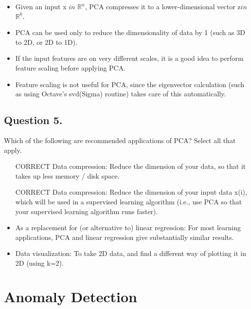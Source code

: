 \begin{itemize}
\item Given an input x $in$ $\mathbb{R}^n$, PCA compresses it to a lower-dimensional vector z$in$ $\mathbb{R}^k$.

\item PCA can be used only to reduce the dimensionality of data by 1 (such as 3D to 2D, or 2D to 1D).

\item If the input features are on very different scales, it is a good idea to perform feature scaling before applying PCA.

\item Feature scaling is not useful for PCA, since the eigenvector calculation (such as using Octave's svd(Sigma) routine) takes care of this automatically.
\end{itemize}
\subsection{ Question 5. }
Which of the following are recommended applications of PCA? Select all that apply.

\begin{itemize}
\item [CORRECT] Data compression: Reduce the dimension of your data, so that it takes up less memory / disk space.

\item [CORRECT] Data compression: Reduce the dimension of your input data x(i), which will be used in a supervised learning algorithm (i.e., use PCA so that your supervised learning algorithm runs faster).

\item As a replacement for (or alternative to) linear regression: For most learning applications, PCA and linear regression give substantially similar results.

\item Data visualization: To take 2D data, and find a different way of plotting it in 2D (using k=2).

\end{itemize}

\section{Anomaly Detection}

